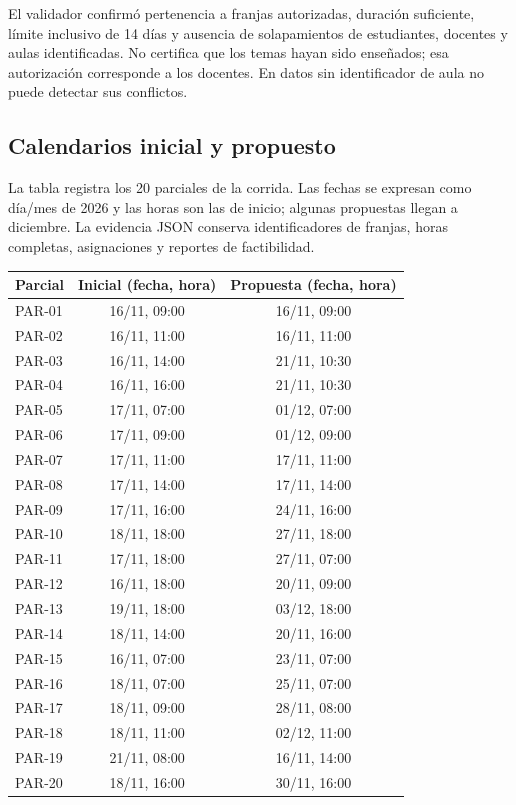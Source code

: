 \documentclass[conference]{IEEEtran}
\begin{document}
El validador confirmó pertenencia a franjas autorizadas, duración suficiente, límite inclusivo de 14 días y ausencia de solapamientos de estudiantes, docentes y aulas identificadas. No certifica que los temas hayan sido enseñados; esa autorización corresponde a los docentes. En datos sin identificador de aula no puede detectar sus conflictos.

\subsection{Calendarios inicial y propuesto}
La tabla registra los 20 parciales de la corrida. Las fechas se expresan como día/mes de 2026 y las horas son las de inicio; algunas propuestas llegan a diciembre. La evidencia JSON conserva identificadores de franjas, horas completas, asignaciones y reportes de factibilidad.
\begin{center}
\begin{tabular}{lcc}
\toprule
Parcial & Inicial (fecha, hora) & Propuesta (fecha, hora)\\
\midrule
PAR-01 & 16/11, 09:00 & 16/11, 09:00\\
PAR-02 & 16/11, 11:00 & 16/11, 11:00\\
PAR-03 & 16/11, 14:00 & 21/11, 10:30\\
PAR-04 & 16/11, 16:00 & 21/11, 10:30\\
PAR-05 & 17/11, 07:00 & 01/12, 07:00\\
PAR-06 & 17/11, 09:00 & 01/12, 09:00\\
PAR-07 & 17/11, 11:00 & 17/11, 11:00\\
PAR-08 & 17/11, 14:00 & 17/11, 14:00\\
PAR-09 & 17/11, 16:00 & 24/11, 16:00\\
PAR-10 & 18/11, 18:00 & 27/11, 18:00\\
PAR-11 & 17/11, 18:00 & 27/11, 07:00\\
PAR-12 & 16/11, 18:00 & 20/11, 09:00\\
PAR-13 & 19/11, 18:00 & 03/12, 18:00\\
PAR-14 & 18/11, 14:00 & 20/11, 16:00\\
PAR-15 & 16/11, 07:00 & 23/11, 07:00\\
PAR-16 & 18/11, 07:00 & 25/11, 07:00\\
PAR-17 & 18/11, 09:00 & 28/11, 08:00\\
PAR-18 & 18/11, 11:00 & 02/12, 11:00\\
PAR-19 & 21/11, 08:00 & 16/11, 14:00\\
PAR-20 & 18/11, 16:00 & 30/11, 16:00\\
\bottomrule
\end{tabular}
\end{center}
\end{document}
